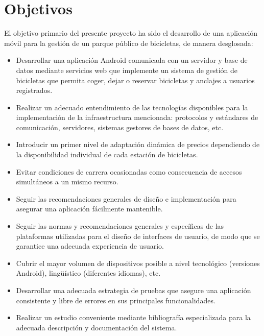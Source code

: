 \chapter{Objetivos}
\label{ch:objetivos}

El objetivo primario del presente proyecto ha sido el desarrollo de una aplicación móvil para la gestión de un parque público de bicicletas, de manera desglosada:

\begin{itemize}  
	\item Desarrollar una aplicación Android comunicada con un servidor y base de datos mediante servicios web que implemente un sistema de gestión de bicicletas que permita coger, dejar o reservar bicicletas y anclajes a usuarios registrados.
	\item Realizar un adecuado entendimiento de las tecnologías disponibles para la implementación de la infraestructura mencionada: protocolos y estándares de comunicación, servidores, sistemas gestores de bases de datos, etc.
	\item Introducir un primer nivel de adaptación dinámica de precios dependiendo de la disponibilidad individual de cada estación de bicicletas.
	\item Evitar condiciones de carrera ocasionadas como consecuencia de accesos simultáneos a un mismo recurso.
	\item Seguir las recomendaciones generales de diseño e implementación para asegurar una aplicación fácilmente mantenible.
	\item Seguir las normas y recomendaciones generales y específicas de las plataformas utilizadas para el diseño de interfaces de usuario, de modo que se garantice una adecuada experiencia de usuario.
	\item Cubrir el mayor volumen de dispositivos posible a nivel tecnológico (versiones Android), lingüístico (diferentes idiomas), etc.
	\item Desarrollar una adecuada estrategia de pruebas que asegure una aplicación consistente y libre de errores en sus principales funcionalidades.
	\item Realizar un estudio conveniente mediante bibliografía especializada para la adecuada descripción y documentación del sistema.
\end{itemize}



